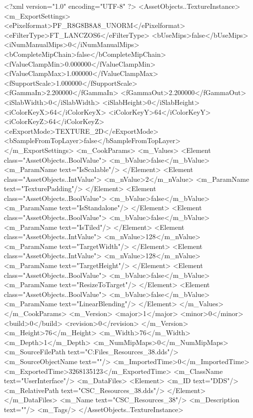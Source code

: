 <?xml version="1.0" encoding="UTF-8" ?>
<AssetObjects..TextureInstance>
	<m_ExportSettings>
		<ePixelformat>PF_R8G8B8A8_UNORM</ePixelformat>
		<eFilterType>FT_LANCZOS6</eFilterType>
		<bUseMips>false</bUseMips>
		<iNumManualMips>0</iNumManualMips>
		<bCompleteMipChain>false</bCompleteMipChain>
		<fValueClampMin>0.000000</fValueClampMin>
		<fValueClampMax>1.000000</fValueClampMax>
		<fSupportScale>1.000000</fSupportScale>
		<fGammaIn>2.200000</fGammaIn>
		<fGammaOut>2.200000</fGammaOut>
		<iSlabWidth>0</iSlabWidth>
		<iSlabHeight>0</iSlabHeight>
		<iColorKeyX>64</iColorKeyX>
		<iColorKeyY>64</iColorKeyY>
		<iColorKeyZ>64</iColorKeyZ>
		<eExportMode>TEXTURE_2D</eExportMode>
		<bSampleFromTopLayer>false</bSampleFromTopLayer>
	</m_ExportSettings>
	<m_CookParams>
		<m_Values>
			<Element class="AssetObjects..BoolValue">
				<m_bValue>false</m_bValue>
				<m_ParamName text="IsScalable"/>
			</Element>
			<Element class="AssetObjects..IntValue">
				<m_nValue>2</m_nValue>
				<m_ParamName text="TexturePadding"/>
			</Element>
			<Element class="AssetObjects..BoolValue">
				<m_bValue>false</m_bValue>
				<m_ParamName text="IsStandalone"/>
			</Element>
			<Element class="AssetObjects..BoolValue">
				<m_bValue>false</m_bValue>
				<m_ParamName text="IsTiled"/>
			</Element>
			<Element class="AssetObjects..IntValue">
				<m_nValue>128</m_nValue>
				<m_ParamName text="TargetWidth"/>
			</Element>
			<Element class="AssetObjects..IntValue">
				<m_nValue>128</m_nValue>
				<m_ParamName text="TargetHeight"/>
			</Element>
			<Element class="AssetObjects..BoolValue">
				<m_bValue>false</m_bValue>
				<m_ParamName text="ResizeToTarget"/>
			</Element>
			<Element class="AssetObjects..BoolValue">
				<m_bValue>false</m_bValue>
				<m_ParamName text="LinearBlending"/>
			</Element>
		</m_Values>
	</m_CookParams>
	<m_Version>
		<major>1</major>
		<minor>0</minor>
		<build>0</build>
		<revision>0</revision>
	</m_Version>
	<m_Height>76</m_Height>
	<m_Width>76</m_Width>
	<m_Depth>1</m_Depth>
	<m_NumMipMaps>0</m_NumMipMaps>
	<m_SourceFilePath text="C:\Users\Shadow\Desktop\Working Files\Icons\Resources\CSC_Resources_38.dds"/>
	<m_SourceObjectName text=""/>
	<m_ImportedTime>0</m_ImportedTime>
	<m_ExportedTime>3268135123</m_ExportedTime>
	<m_ClassName text="UserInterface"/>
	<m_DataFiles>
		<Element>
			<m_ID text="DDS"/>
			<m_RelativePath text="CSC_Resources_38.dds"/>
		</Element>
	</m_DataFiles>
	<m_Name text="CSC_Resources_38"/>
	<m_Description text=""/>
	<m_Tags/>
</AssetObjects..TextureInstance>

